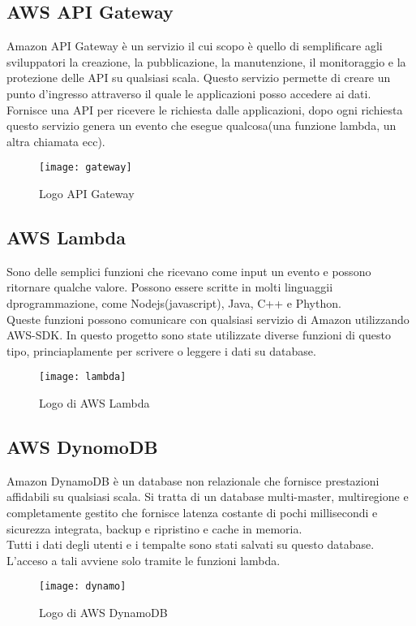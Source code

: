 \subsection{AWS API Gateway} Amazon API Gateway è un servizio il cui scopo è quello di semplificare agli sviluppatori
la creazione, la pubblicazione, la manutenzione, il monitoraggio e la protezione
delle API su qualsiasi scala.
Questo servizio permette di creare un punto d'ingresso attraverso il quale le applicazioni posso accedere ai dati. Fornisce una API per ricevere le richiesta dalle applicazioni, dopo ogni richiesta questo servizio genera un evento che esegue qualcosa(una funzione lambda, un altra chiamata ecc).
\begin{figure}[!h] 
	\centering 
	\texttt{[image: gateway]}
	\caption{Logo API Gateway}
\end{figure}

\subsection{AWS Lambda} 

Sono delle semplici funzioni che ricevano come input un evento e possono ritornare qualche valore. Possono essere scritte in molti linguaggii dprogrammazione, come Nodejs(javascript), Java, C++ e Phython. 
\\

Queste funzioni possono comunicare con qualsiasi servizio di Amazon utilizzando AWS-SDK. In questo progetto sono state utilizzate diverse funzioni di questo tipo, princiaplamente per scrivere o leggere i dati su database.
\begin{figure}[!h] 
	\centering 
	\texttt{[image: lambda]}
	\caption{Logo di AWS Lambda}
\end{figure}  

\subsection{AWS DynomoDB} 
Amazon DynamoDB è un database non relazionale che fornisce prestazioni affidabili su qualsiasi scala. Si tratta di un database multi-master, multiregione e completamente gestito che fornisce latenza costante di pochi millisecondi e sicurezza integrata, backup e ripristino e cache in memoria.
\\

 Tutti i dati degli utenti e i tempalte sono stati salvati su questo database. L'acceso a tali avviene solo tramite le funzioni lambda.   
\begin{figure}[!h] 
	\centering 
	\texttt{[image: dynamo]}
	\caption{Logo di AWS DynamoDB}
\end{figure}

